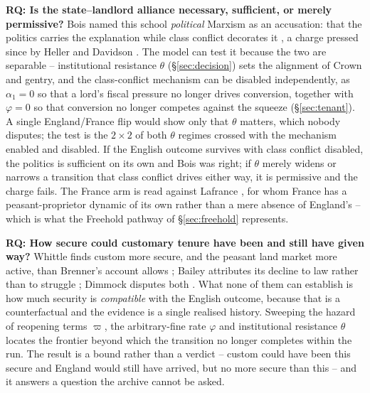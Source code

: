 \documentclass[11pt,english]{article}
\newcounter{rqctr}
\renewcommand{\therqctr}{\arabic{rqctr}}
\newcommand{\rqitem}[2]{%
  \refstepcounter{rqctr}\label{#1}%
  \medskip\noindent\textbf{RQ\therqctr: #2}}
\begin{document}
\rqitem{rq:alliance}{Is the state--landlord alliance necessary, sufficient, or merely permissive?}
Bois named this school \emph{political} Marxism as an accusation: that the politics carries the explanation while class conflict decorates it \cite{bois1978against}, a charge pressed since by Heller \cite{heller2011birth} and Davidson \cite{davidson2012revolutionary}. The model can test it because the two are separable -- institutional resistance $\theta$ (\S\ref{sec:decision}) sets the alignment of Crown and gentry, and the class-conflict mechanism can be disabled independently, as $\alpha_1=0$ so that a lord's fiscal pressure no longer drives conversion, together with $\varphi=0$ so that conversion no longer competes against the squeeze (\S\ref{sec:tenant}). A single England/France flip would show only that $\theta$ matters, which nobody disputes; the test is the $2\times2$ of both $\theta$ regimes crossed with the mechanism enabled and disabled. If the English outcome survives with class conflict disabled, the politics is sufficient on its own and Bois was right; if $\theta$ merely widens or narrows a transition that class conflict drives either way, it is permissive and the charge fails. The France arm is read against Lafrance \cite{lafrance2019making}, for whom France has a peasant-proprietor dynamic of its own rather than a mere absence of England's -- which is what the Freehold pathway of \S\ref{sec:freehold} represents.

\rqitem{rq:security}{How secure could customary tenure have been and still have given way?}
Whittle finds custom more secure, and the peasant land market more active, than Brenner's account allows \cite{whittle2000development}; Bailey attributes its decline to law rather than to struggle \cite{bailey2014decline}; Dimmock disputes both \cite{dimmock2014origin}. What none of them can establish is how much security is \emph{compatible} with the English outcome, because that is a counterfactual and the evidence is a single realised history. Sweeping the hazard of reopening terms $\varpi$, the arbitrary-fine rate $\varphi$ and institutional resistance $\theta$ locates the frontier beyond which the transition no longer completes within the run. The result is a bound rather than a verdict -- custom could have been this secure and England would still have arrived, but no more secure than this -- and it answers a question the archive cannot be asked.
\end{document}

